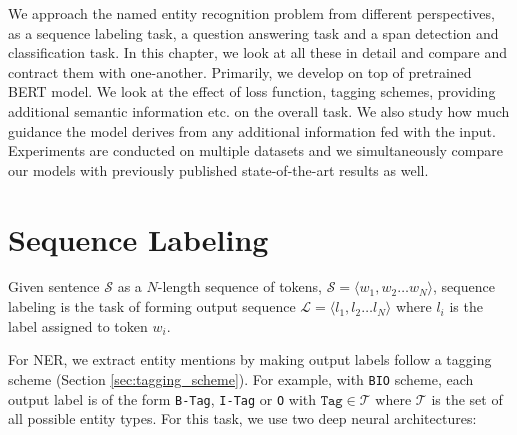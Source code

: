 We approach the named entity recognition problem from different perspectives, as a sequence labeling task, a question answering task and a span detection and classification task. In this chapter, we look at all these in detail and compare and contract them with one-another. Primarily, we develop on top of pretrained BERT model. We look at the effect of loss function, tagging schemes, providing additional semantic information etc. on the overall task. We also study how much guidance the model derives from any additional information fed with the input. Experiments are conducted on multiple datasets and we simultaneously compare our models with previously published state-of-the-art results as well. 

\section{Sequence Labeling}
\begin{definition}
\label{def:seq_labeling}
    Given sentence $\mathcal{S}$ as a $N$-length sequence of tokens, $\mathcal{S} = \langle w_1, w_2 \ldots w_N \rangle$, sequence labeling is the task of forming output sequence $\mathcal{L} = \langle l_1, l_2 \ldots l_N \rangle$ where $l_i$ is the label assigned to token $w_i$. 
\end{definition}

For NER, we extract entity mentions by making output labels follow a tagging scheme (Section \ref{sec:tagging_scheme}). For example, with \texttt{BIO} scheme, each output label is of the form \texttt{B-Tag}, \texttt{I-Tag} or \texttt{O} with $\texttt{Tag} \in \mathcal{T}$ where $\mathcal{T}$ is the set of all possible entity types. For this task, we use two deep neural architectures:

